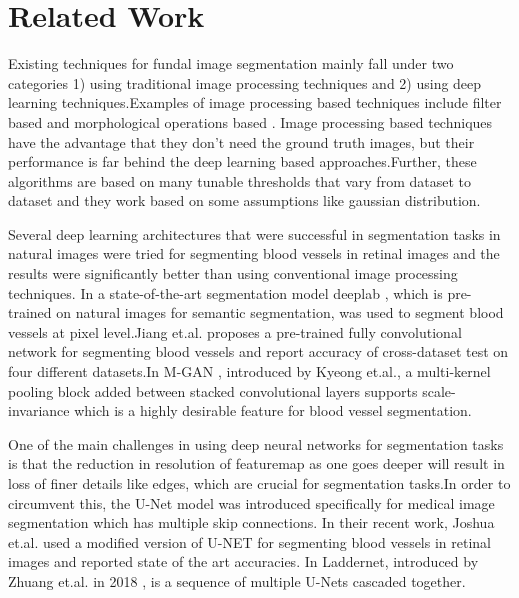 \documentclass{article}
\begin{document}
\section{Related Work}
Existing  techniques for fundal image segmentation mainly fall under two categories 1) using traditional image processing techniques and 2) using deep learning techniques.Examples of image processing based techniques include filter based \cite{zhang2010retinal} \cite{yavuz2011retinal} \cite{aslan2018segmentation} and morphological operations based \cite{hassan2015retinal}\cite{singh2014new}.
Image processing based techniques have the advantage that they don’t need the ground truth images, but their performance is far behind the deep learning based approaches.Further, these algorithms are based on many tunable thresholds that vary from dataset to dataset and they work based on some assumptions like gaussian distribution.

Several deep learning architectures that were successful in segmentation tasks \cite{chen2017deeplab} in natural images were tried for segmenting blood vessels in retinal images and the results were significantly better than using conventional image processing techniques.
In \cite{vengalil2016customizing} a state-of-the-art segmentation model deeplab \cite{chen2017deeplab}, which is pre-trained on natural images  for semantic segmentation,  was used to segment blood vessels at pixel level.Jiang et.al. proposes \cite {jiang2018retinal} a  pre-trained fully convolutional network for segmenting blood vessels and report accuracy of cross-dataset test on four different datasets.In M-GAN \cite{park2020m}, introduced by Kyeong et.al., a multi-kernel pooling block added between stacked convolutional layers supports scale-invariance which is a highly desirable feature for blood vessel segmentation.

One of the main challenges in using deep neural networks for segmentation tasks is that the reduction in resolution of featuremap as one goes deeper will result in loss of finer details like edges, which are crucial for segmentation tasks.In order to circumvent this, the U-Net \cite{ronneberger2015u} model was introduced specifically for medical image segmentation which has multiple skip connections.
In their recent work, Joshua et.al. \cite{joshua2020blood} used a modified version of U-NET for segmenting blood vessels in retinal images and reported state of the art accuracies.
In Laddernet, introduced by Zhuang et.al. in 2018 \cite{zhuang2018laddernet},  is a sequence of multiple U-Nets cascaded together.
\end{document}
